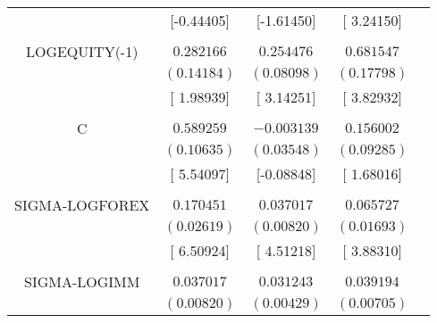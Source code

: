\begin{tabular}{lrrrr}
\multicolumn{1}{c}{}&\multicolumn{1}{c}{[-0.44405]}&\multicolumn{1}{c}{[-1.61450]}&\multicolumn{1}{c}{[ 3.24150]}&\multicolumn{1}{c}{}\\
\multicolumn{1}{c}{}&\multicolumn{1}{c}{}&\multicolumn{1}{c}{}&\multicolumn{1}{c}{}&\multicolumn{1}{c}{}\\
\multicolumn{1}{c}{LOGEQUITY(-1)}&\multicolumn{1}{c}{$0.282166$}&\multicolumn{1}{c}{$0.254476$}&\multicolumn{1}{c}{$0.681547$}&\multicolumn{1}{c}{}\\
\multicolumn{1}{c}{}&\multicolumn{1}{c}{$(0.14184)$}&\multicolumn{1}{c}{$(0.08098)$}&\multicolumn{1}{c}{$(0.17798)$}&\multicolumn{1}{c}{}\\
\multicolumn{1}{c}{}&\multicolumn{1}{c}{[ 1.98939]}&\multicolumn{1}{c}{[ 3.14251]}&\multicolumn{1}{c}{[ 3.82932]}&\multicolumn{1}{c}{}\\
\multicolumn{1}{c}{}&\multicolumn{1}{c}{}&\multicolumn{1}{c}{}&\multicolumn{1}{c}{}&\multicolumn{1}{c}{}\\
\multicolumn{1}{c}{C}&\multicolumn{1}{c}{$0.589259$}&\multicolumn{1}{c}{$-0.003139$}&\multicolumn{1}{c}{$0.156002$}&\multicolumn{1}{c}{}\\
\multicolumn{1}{c}{}&\multicolumn{1}{c}{$(0.10635)$}&\multicolumn{1}{c}{$(0.03548)$}&\multicolumn{1}{c}{$(0.09285)$}&\multicolumn{1}{c}{}\\
\multicolumn{1}{c}{}&\multicolumn{1}{c}{[ 5.54097]}&\multicolumn{1}{c}{[-0.08848]}&\multicolumn{1}{c}{[ 1.68016]}&\multicolumn{1}{c}{}\\
\multicolumn{1}{c}{}&\multicolumn{1}{c}{}&\multicolumn{1}{c}{}&\multicolumn{1}{c}{}&\multicolumn{1}{c}{}\\
\multicolumn{1}{c}{SIGMA-LOGFOREX}&\multicolumn{1}{c}{$0.170451$}&\multicolumn{1}{c}{$0.037017$}&\multicolumn{1}{c}{$0.065727$}&\multicolumn{1}{c}{}\\
\multicolumn{1}{c}{}&\multicolumn{1}{c}{$(0.02619)$}&\multicolumn{1}{c}{$(0.00820)$}&\multicolumn{1}{c}{$(0.01693)$}&\multicolumn{1}{c}{}\\
\multicolumn{1}{c}{}&\multicolumn{1}{c}{[ 6.50924]}&\multicolumn{1}{c}{[ 4.51218]}&\multicolumn{1}{c}{[ 3.88310]}&\multicolumn{1}{c}{}\\
\multicolumn{1}{c}{}&\multicolumn{1}{c}{}&\multicolumn{1}{c}{}&\multicolumn{1}{c}{}&\multicolumn{1}{c}{}\\
\multicolumn{1}{c}{SIGMA-LOGIMM}&\multicolumn{1}{c}{$0.037017$}&\multicolumn{1}{c}{$0.031243$}&\multicolumn{1}{c}{$0.039194$}&\multicolumn{1}{c}{}\\
\multicolumn{1}{c}{}&\multicolumn{1}{c}{$(0.00820)$}&\multicolumn{1}{c}{$(0.00429)$}&\multicolumn{1}{c}{$(0.00705)$}&\multicolumn{1}{c}{}\\

\end{tabular}
